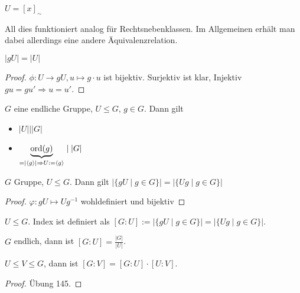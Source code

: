 \begin{lemma}
    $U = [x]_{\sim}$
\end{lemma}

All dies funktioniert analog für Rechtsnebenklassen. Im Allgemeinen erhält man dabei allerdings eine andere Äquivalenzrelation.

\begin{lemma}
    $\vert gU \vert = \vert U \vert$
\end{lemma}
\begin{proof}
    $\phi: U \to gU, u \mapsto g\cdot u$ ist bijektiv. Surjektiv ist klar, Injektiv $gu = gu' \Rightarrow u = u'$.
\end{proof}

\begin{theorem}
    $G$ eine endliche Gruppe, $U \le G$, $g \in G$. Dann gilt
    \begin{itemize}[topsep=0cm, label={--}]
        \item $\vert U \vert \mid \vert G \vert$ 
        \item $\underbrace{\operatorname{ord}(g)}_{= \vert \langle g \rangle \vert \Rightarrow U := \langle g \rangle} \mid \vert G \vert $
    \end{itemize}
\end{theorem}

\begin{example}
    
\end{example}

\begin{lemma}
    $G$ Gruppe, $U \le G$. Dann gilt $\vert \{gU \mid g \in G\}\vert = \vert \{Ug \mid g \in G\}\vert$
\end{lemma}
\begin{proof}
    $\varphi: gU \mapsto Ug^{-1}$ wohldefiniert und bijektiv
\end{proof}

\begin{definition}
    $U \le G$. Index ist definiert als $[G:U] := \vert \{gU \mid g \in G\}\vert = \vert \{Ug \mid g \in G\}\vert$. 
\end{definition}

\begin{remark}
    $G$ endlich, dann ist $[G:U] = \frac{\vert G \vert}{\vert U \vert}$.
\end{remark}

\begin{theorem}[Indexsatz]
    $U \le V \le G$, dann ist $[G:V] = [G:U] \cdot [U:V]$. 
\end{theorem}
\begin{proof}
    Übung 145.
\end{proof}

